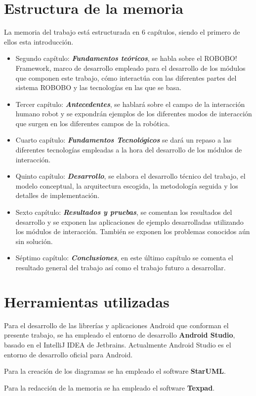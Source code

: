  \section{Estructura de la memoria}
 \label{sec:intro-memory-structure}
 La memoria del trabajo está estructurada en 6 capítulos, siendo el primero de ellos esta introducción.
 \begin{itemize}
 	\item Segundo capítulo: \textbf{\textit{Fundamentos teóricos}}, se habla sobre el ROBOBO! Framework, marco de desarrollo empleado para el desarrollo de los módulos que componen este trabajo, cómo interactúa con las diferentes partes del sistema ROBOBO y las tecnologías en las que se basa.
 	
 	\item Tercer capítulo: \textbf{\textit{Antecedentes}}, se hablará sobre el campo de la interacción humano robot y se expondrán ejemplos de los diferentes modos de interacción que surgen en los diferentes campos de la robótica. 
 	\item Cuarto capítulo: \textbf{\textit{Fundamentos Tecnológicos}} se dará un repaso a las diferentes tecnologías empleadas a la hora del desarrollo de los módulos de interacción.
 	
 	\item Quinto capítulo: \textbf{\textit{Desarrollo}}, se elabora el desarrollo técnico del trabajo, el modelo conceptual, la arquitectura escogida, la metodología seguida y los detalles de implementación. 
 	
 	\item Sexto capítulo: \textbf{\textit{Resultados y pruebas}}, se comentan los resultados del desarrollo y se exponen las aplicaciones de ejemplo desarrolladas utilizando los módulos de interacción. También se exponen los problemas conocidos aún sin solución.
 
 	\item Séptimo capítulo: \textbf{\textit{Conclusiones}}, en este último capítulo se comenta el resultado general del trabajo así como el trabajo futuro a desarrollar.


 \end{itemize}
 
 \section{Herramientas utilizadas}
  \label{sec:intro-tools}
 Para el desarrollo de las librerías y aplicaciones Android que conforman el presente trabajo, se ha empleado el entorno de desarrollo \textbf{Android Studio}, basado en el IntelliJ IDEA de Jetbrains. Actualmente Android Studio es el entorno de desarrollo oficial para Android.
 
 Para la creación de los diagramas se ha empleado el software \textbf{StarUML}.
 
 Para la redacción de la memoria se ha empleado el software \textbf{Texpad}.
 
 
 
  
 
 



